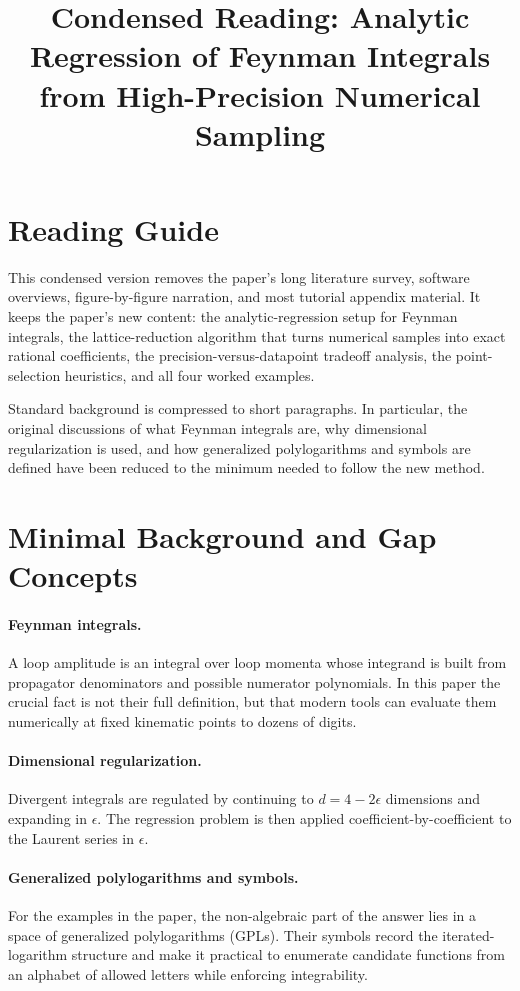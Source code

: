\documentclass[11pt]{article}
\title{Condensed Reading: Analytic Regression of Feynman Integrals from High-Precision Numerical Sampling}
\author{}
\date{}
\begin{document}
\maketitle

\section*{Reading Guide}
This condensed version removes the paper's long literature survey, software overviews, figure-by-figure narration, and most tutorial appendix material. It keeps the paper's new content: the analytic-regression setup for Feynman integrals, the lattice-reduction algorithm that turns numerical samples into exact rational coefficients, the precision-versus-datapoint tradeoff analysis, the point-selection heuristics, and all four worked examples.

Standard background is compressed to short paragraphs. In particular, the original discussions of what Feynman integrals are, why dimensional regularization is used, and how generalized polylogarithms and symbols are defined have been reduced to the minimum needed to follow the new method.

\section{Minimal Background and Gap Concepts}
\paragraph{Feynman integrals.}
A loop amplitude is an integral over loop momenta whose integrand is built from propagator denominators and possible numerator polynomials. In this paper the crucial fact is not their full definition, but that modern tools can evaluate them numerically at fixed kinematic points to dozens of digits.

\paragraph{Dimensional regularization.}
Divergent integrals are regulated by continuing to $d=4-2\epsilon$ dimensions and expanding in $\epsilon$. The regression problem is then applied coefficient-by-coefficient to the Laurent series in $\epsilon$.

\paragraph{Generalized polylogarithms and symbols.}
For the examples in the paper, the non-algebraic part of the answer lies in a space of generalized polylogarithms (GPLs). Their symbols record the iterated-logarithm structure and make it practical to enumerate candidate functions from an alphabet of allowed letters while enforcing integrability.
\end{document}

